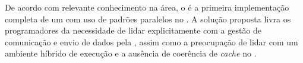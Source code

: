 De acordo com relevante conhecimento na área, o \pskelmppa é a primeira implementação completa de um \fw com uso de padrões paralelos no \mppa. A solução proposta livra os programadores da necessidade de lidar explicitamente com a gestão de comunicação e envio de dados pela \noc, assim como a preocupação de lidar com um ambiente híbrido de execução e a ausência de coerência de \textit{cache} no \mppa.